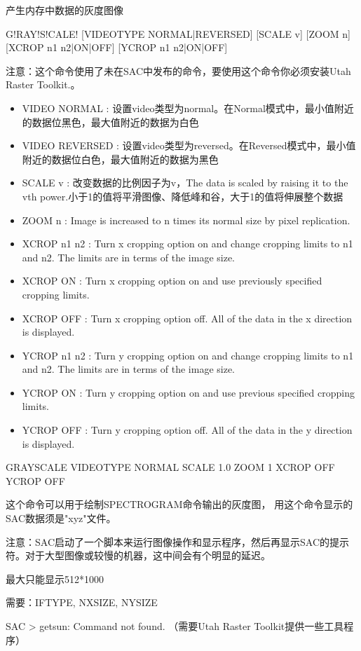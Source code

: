 \label{cmd:grayscale}

产生内存中数据的灰度图像

\begin{SACSTX}
G!RAY!S!CALE! [VIDEOTYPE NORMAL|REVERSED] [SCALE v] [ZOOM n] [XCROP n1 n2|ON|OFF] 
    [YCROP n1 n2|ON|OFF]
\end{SACSTX}

注意：这个命令使用了未在SAC中发布的命令，要使用这个命令你必须安装Utah Raster Toolkit.。

\begin{itemize}
\item VIDEO NORMAL : 设置video类型为normal。在Normal模式中，最小值附近的数据位黑色，最大值附近的数据为白色
\item VIDEO REVERSED : 设置video类型为reversed。在Reversed模式中，最小值附近的数据位白色，最大值附近的数据为黑色
\item SCALE v : 改变数据的比例因子为v，The data is scaled by raising it to the vth power.小于1的值将平滑图像、降低峰和谷，大于1的值将伸展整个数据
\item ZOOM n : Image is increased to n times its normal size by pixel replication.
\item XCROP n1 n2 : Turn x cropping option on and change cropping limits to n1 and n2. The limits are in terms of the image size.
\item XCROP {ON} : Turn x cropping option on and use previously specified cropping limits.
\item XCROP OFF :  Turn x cropping option off.  All of the data in the x direction is displayed.
\item YCROP n1 n2 : Turn y cropping option on and change cropping limits to n1 and n2. The limits are in terms of the image size.
\item YCROP {ON} : Turn y cropping option on and use previous specified cropping limits.
\item YCROP OFF :  Turn y cropping option off.  All of the data in the y direction is displayed. 
\end{itemize}

\begin{SACDFT}
GRAYSCALE VIDEOTYPE NORMAL SCALE 1.0 ZOOM 1 XCROP OFF YCROP OFF
\end{SACDFT}

这个命令可以用于绘制SPECTROGRAM命令输出的灰度图， 用这个命令显示的SAC数据须是"xyz"文件。

注意：SAC启动了一个脚本来运行图像操作和显示程序，然后再显示SAC的提示符。对于大型图像或较慢的机器，这中间会有个明显的延迟。

最大只能显示512*1000

需要：IFTYPE, NXSIZE, NYSIZE

SAC > getsun: Command not found.  （需要Utah Raster Toolkit提供一些工具程序）

